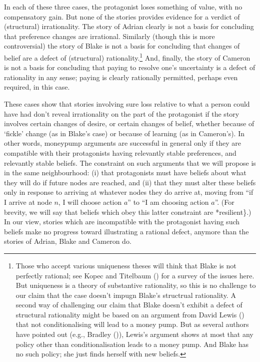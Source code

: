 \documentclass[
  11pt,
  letterpaper,
  DIV=11,
  numbers=noendperiod,
  twoside]{scrartcl}
\begin{document}
In each of these three cases, the protagonist loses something of value,
with no compensatory gain. But none of the stories provides evidence for
a verdict of (structural) irrationality. The story of Adrian clearly is
not a basis for concluding that preference changes are irrational.
Similarly (though this is more controversial) the story of Blake is not
a basis for concluding that changes of belief are a defect of
(structural) rationality.\footnote{Those who accept various uniqueness
  theses will think that Blake is not perfectly rational; see Kopec and
  Titelbaum () for a survey of
  the issues here. But uniqueness is a theory of substantive
  rationality, so this is no challenge to our claim that the case
  doesn't impugn Blake's structrual rationality. A second way of
  challenging our claim that Blake doesn't exhibit a defect of
  structural rationality might be based on an argument from David Lewis
  () that not conditionalising will lead
  to a money pump. But as several authors have pointed out (e.g.,
  Bradley ()), Lewis's argument shows at
  most that any policy other than conditionalisation leads to a money
  pump. And Blake has no such policy; she just finds herself with new
  beliefs.} And, finally, the story of Cameron is not a basis for
concluding that paying to resolve one's uncertainty is a defect of
rationality in any sense; paying is clearly rationally permitted,
perhaps even required, in this case.

These cases show that stories involving sure loss relative to what a
person could have had don't reveal irrationality on the part of the
protagonist if the story involves certain changes of desire, or certain
changes of belief, whether because of `fickle' change (as in Blake's
case) or because of learning (as in Cameron's). In other words,
moneypump arguments are successful in general only if they are
compatible with their protagonists having relevantly stable preferences,
and relevantly stable beliefs. The constraint on such arguments that we
will propose is in the same neighbourhood: (i) that protagonists must
have beliefs about what they will do if future nodes are reached, and
(ii) that they must alter these beliefs only in response to arriving at
whatever nodes they do arrive at, moving from ``if I arrive at node
\(n\), I will choose action \(a\)'' to ``I am choosing action \(a\)''.
(For brevity, we will say that beliefs which obey this latter constraint
are *resilient\}.) In our view, stories which are incompatible with the
protagonist having such beliefs make no progress toward illustrating a
rational defect, anymore than the stories of Adrian, Blake and Cameron
do.
\end{document}

